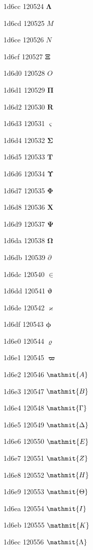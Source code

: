 \documentclass[11pt]{article}
\begin{document}
1d6cc 120524 \ensuremath{\mathbf{\Lambda}}

1d6cd 120525 \ensuremath{M}

1d6ce 120526 \ensuremath{N}

1d6cf 120527 \ensuremath{\mathbf{\Xi}}

1d6d0 120528 \ensuremath{O}

1d6d1 120529 \ensuremath{\mathbf{\Pi}}

1d6d2 120530 \ensuremath{\mathbf{R}}

1d6d3 120531 \ensuremath{\mathbf{\varsigma}}

1d6d4 120532 \ensuremath{\mathbf{\Sigma}}

1d6d5 120533 \ensuremath{\mathbf{T}}

1d6d6 120534 \ensuremath{\mathbf{\Upsilon}}

1d6d7 120535 \ensuremath{\mathbf{\Phi}}

1d6d8 120536 \ensuremath{\mathbf{X}}

1d6d9 120537 \ensuremath{\mathbf{\Psi}}

1d6da 120538 \ensuremath{\mathbf{\Omega}}

1d6db 120539 \ensuremath{\partial}

1d6dc 120540 \ensuremath{\in}

1d6dd 120541 \ensuremath{\mathbf{\vartheta}}

1d6de 120542 \ensuremath{\mathbf{\varkappa}}

1d6df 120543 \ensuremath{\mathbf{\phi}}

1d6e0 120544 \ensuremath{\mathbf{\varrho}}

1d6e1 120545 \ensuremath{\mathbf{\varpi}}

1d6e2 120546 \ensuremath{\mathmit{A}}

1d6e3 120547 \ensuremath{\mathmit{B}}

1d6e4 120548 \ensuremath{\mathmit{\Gamma}}

1d6e5 120549 \ensuremath{\mathmit{\Delta}}

1d6e6 120550 \ensuremath{\mathmit{E}}

1d6e7 120551 \ensuremath{\mathmit{Z}}

1d6e8 120552 \ensuremath{\mathmit{H}}

1d6e9 120553 \ensuremath{\mathmit{\Theta}}

1d6ea 120554 \ensuremath{\mathmit{I}}

1d6eb 120555 \ensuremath{\mathmit{K}}

1d6ec 120556 \ensuremath{\mathmit{\Lambda}}
\end{document}
